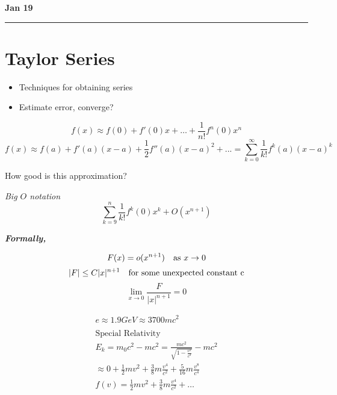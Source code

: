 \documentclass[svgnames]{article}   	%
\begin{document}
\newpage
\noindent \textbf{Jan 19} \hrule
\section{Taylor Series} 

\begin{itemize}
  \item Techniques for obtaining series
  \item Estimate error, converge?     
\end{itemize}

\vspace{5px} \[
  f(x) \approx f(0) + f'(0)x + \dots + \frac{1}{n!}f^{n}(0)x^n
\] \vspace{5px} 
\[
  f(x) \approx f(a) + f'(a)(x-a) + \frac{1}{2}f''(a)(x-a)^2 + ... = \sum_{k=0}^{\infty} \frac{1}{k!}f^{k} (a)
  (x-a)^k
\]

\begin{tcolorbox}[colback = red!5!white, colframe = red!50!black, title
  = Question]
  
  How good is this approximation? 

\end{tcolorbox}

\textit{ Big $O$ notation}
\vspace{5px} \[
\sum_{k=9}^{n} \frac{1}{k!}f^k(0) x^k + O(x^{n+1})
\] \vspace{5px}

\textit{ \textbf{Formally,}}

\vspace{5px} \[
  F(x) = o(x^{n+1}) \hspace{10px} \text{as } x \rightarrow 0
\] \vspace{5px}
\[
  |F| \leq C|x|^{n+1} \hspace{10px} \text{for some unexpected constant c}
\] \vspace{5px}
\[
  \lim_{x\to 0} \frac{F}{|x|^{n+1}} = 0
\] \vspace{5px}
\begin{tcolorbox}[colback = blue!5!white, colframe = blue!50!black, title
  = Example]
  \begin{gather*}
  e \approx 1.9 GeV \approx 3700 mc^2 \\\\
  \text{Special Relativity} \\
  E_k = m_0 c^2 - mc^2 = \frac{mc^2}{ \sqrt{ 1 - \frac{v^2}{c^2}}} - mc^2 \\
  \approx 0 + \frac{1}{2}mv^2 + \frac{3}{8}m\frac{v^4}{c^2} + \frac{5}{16}m
  \frac{v^8}{c^4} \\
  f(v) = \frac{1}{2}mv^2  + \frac{3}{8}m\frac{v^4}{c^2} + \dots 
  \end{gather*}
\end{tcolorbox}
\end{document}
